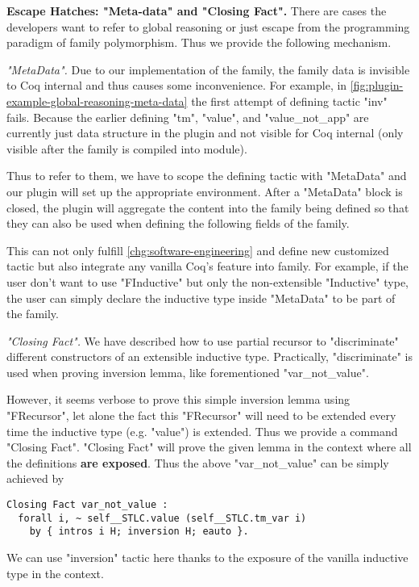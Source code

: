 \textbf{Escape Hatches: "Meta-data" and "Closing Fact".} There are cases the developers want to refer to global reasoning or just escape from the programming paradigm of family polymorphism. Thus we provide the following mechanism.

\textit{"MetaData".} Due to our implementation of the family,
the family data is invisible to Coq internal and thus causes some
inconvenience. For example, in
\cref{fig:plugin-example-global-reasoning-meta-data} the first attempt
of defining tactic "inv" fails. Because the earlier defining "tm",
"value", and "value_not_app" are currently just data structure in the
plugin and not visible for Coq internal (only visible after the family
is compiled into module). 

Thus to refer to them, we have to scope the defining tactic with
"MetaData" and our plugin will set up the appropriate environment. After
a "MetaData" block is closed, the plugin will aggregate the content into
the family being defined so that they can also be used when defining
the following fields of the family.


This can not only fulfill \ref{chg:software-engineering} and define new customized tactic but also integrate any vanilla Coq's feature into family. For example, if the user don't want to use "FInductive" but only the non-extensible "Inductive" type, the user can simply declare the inductive type inside "MetaData" to be part of the family.


\textit{"Closing Fact".} We have described how to use partial recursor to "discriminate" different constructors of an extensible inductive type. Practically, "discriminate" is used when proving inversion lemma, like forementioned "var_not_value". 

However, it seems verbose to prove this simple inversion lemma using "FRecursor", let alone the fact this "FRecursor" will need to be extended every time the inductive type (e.g. "value") is extended. Thus we provide a command "Closing Fact". "Closing Fact" will prove the given lemma in the context where all the definitions \textbf{are exposed}. Thus the above "var_not_value" can be simply achieved by 
\begin{verbatim}
Closing Fact var_not_value : 
  forall i, ~ self__STLC.value (self__STLC.tm_var i) 
    by { intros i H; inversion H; eauto }.
\end{verbatim}
We can use "inversion" tactic here thanks to the exposure of the vanilla inductive type in the context. 

